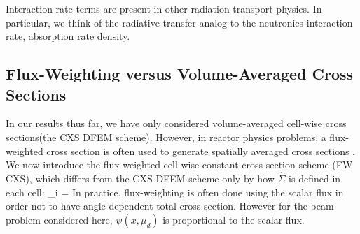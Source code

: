 Interaction rate terms are present in other radiation transport physics.
In particular, we think of the radiative transfer analog to the neutronics interaction rate, absorption rate density.


\subsection{Flux-Weighting versus Volume-Averaged Cross Sections}

In our results thus far, we have only considered volume-averaged cell-wise cross sections(the CXS DFEM scheme).
However, in reactor physics problems, a flux-weighted cross section is often used to generate spatially averaged cross sections \cite{bell_glasstone}.
We now introduce the flux-weighted cell-wise constant cross section scheme (FW CXS), which differs from the CXS DFEM scheme only by how $\hat{\Sigma}$ is defined in each cell: 
\benum
\hat{\Sigma}_i =  \pep
\label{eq:chap3_fw_cxs}
\eenum
In practice, flux-weighting is often done using the scalar flux in order not to have angle-dependent total cross section.  However for the beam problem considered here, $\psi(x,\mu_d)$ is proportional to the scalar flux.

